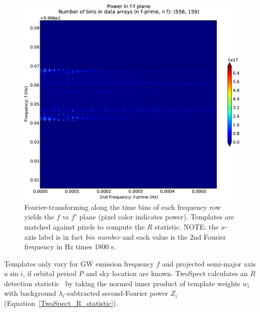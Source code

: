 \begin{figure}
\begin{center}
\includegraphics[keepaspectratio,height=0.35\paperheight]{plots/ffplane-4e21-on-4e24.eps}
\caption{Fourier-transforming along the time bins of each frequency row yields the $f$ vs $f'$ plane (pixel color indicates power). Templates are matched against pixels to compute the $R$ statistic. NOTE: the $x$-axis label is in fact \textit{bin number} and each value is the 2nd Fourier frequency in Hz times 1800 s.}
\label{ffplane-figure}
\end{center}
\end{figure}

 
Templates only vary for GW emission frequency $f$ and projected semi-major axis $a \sin i$, if orbital period $P$ and sky location are known.
TwoSpect calculates an $R$ detection statistic~\cite{GoetzTwoSpectMethods2011} by taking the normed inner product of template weights $w_i$ with background $\lambda_i$-subtracted second-Fourier power $Z_i$ (Equation~\ref{TwoSpect_R_statistic}).

